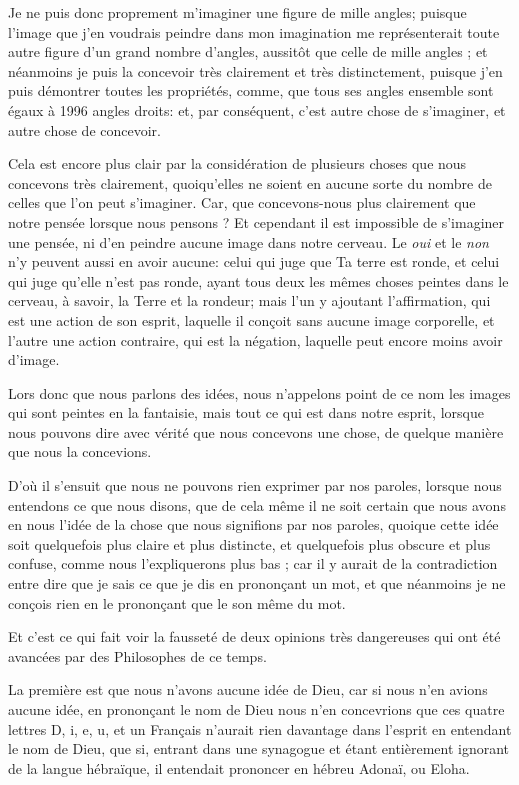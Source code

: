Je ne puis donc proprement m'imaginer une figure de mille angles; puisque l'image que j'en voudrais peindre dans mon imagination me représenterait toute autre figure d'un grand nombre d'angles, aussitôt que celle de mille angles ; et néanmoins je puis la concevoir très clairement et très distinctement, puisque j'en puis démontrer toutes les propriétés, comme, que tous ses angles ensemble sont égaux à 1996 angles droits: et, par conséquent, c'est autre chose de s'imaginer, et autre chose de concevoir.

Cela est encore plus clair par la considération de plusieurs choses que nous concevons très clairement, quoiqu'elles ne soient en aucune sorte du nombre de celles que l'on peut s'imaginer. Car, que concevons-nous plus clairement que notre pensée lorsque nous pensons ? Et cependant il est impossible de s'imaginer une pensée, ni d'en peindre aucune image dans notre cerveau. Le \emph{oui} et le \emph{non} n'y peuvent aussi en avoir aucune: celui qui juge que Ta terre est ronde, et celui qui juge qu'elle n'est pas ronde, ayant tous deux les mêmes choses peintes dans le cerveau, à savoir, la Terre et la rondeur; mais l'un y ajoutant l'affirmation, qui est une action de son esprit, laquelle il conçoit sans aucune image corporelle, et l'autre une action contraire, qui est la négation, laquelle peut encore moins avoir d'image.

Lors donc que nous parlons des idées, nous n'appelons point de ce nom les images qui sont peintes en la fantaisie, mais tout ce qui est dans notre esprit, lorsque nous pouvons dire avec vérité que nous concevons une chose, de quelque manière que nous la concevions.

D'où il s'ensuit que nous ne pouvons rien exprimer par nos paroles, lorsque nous entendons ce que nous disons, que de cela même il ne soit certain que nous avons en nous l'idée de la chose que nous signifions par nos paroles, quoique cette idée soit quelquefois plus claire et plus distincte, et quelquefois plus obscure et plus confuse, comme nous l'expliquerons plus bas ; car il y aurait de la contradiction entre dire que je sais ce que je dis en prononçant un mot, et que néanmoins je ne conçois rien en le prononçant que le son même du mot.

Et c'est ce qui fait voir la fausseté de deux opinions très dangereuses qui ont été avancées par des Philosophes de ce temps.

La première est que nous n'avons aucune idée de Dieu, car si nous n'en avions aucune idée, en prononçant le nom de Dieu nous n'en concevrions que ces quatre lettres D, i, e, u, et un Français n'aurait rien davantage dans l'esprit en entendant le nom de Dieu, que si, entrant dans une synagogue et étant entièrement ignorant de la langue hébraïque, il entendait prononcer en hébreu Adonaï, ou Eloha.

